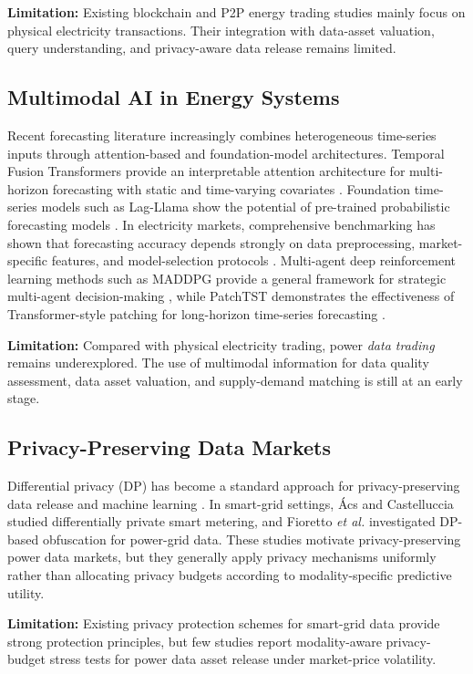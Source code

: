 \documentclass{ieeeaccess}
\begin{document}
\textbf{Limitation:} Existing blockchain and P2P energy trading studies mainly focus on physical electricity transactions. Their integration with data-asset valuation, query understanding, and privacy-aware data release remains limited.

\subsection{Multimodal AI in Energy Systems}
Recent forecasting literature increasingly combines heterogeneous time-series inputs through attention-based and foundation-model architectures. Temporal Fusion Transformers provide an interpretable attention architecture for multi-horizon forecasting with static and time-varying covariates \cite{b14}. Foundation time-series models such as Lag-Llama show the potential of pre-trained probabilistic forecasting models \cite{b15}. In electricity markets, comprehensive benchmarking has shown that forecasting accuracy depends strongly on data preprocessing, market-specific features, and model-selection protocols \cite{b16}. Multi-agent deep reinforcement learning methods such as MADDPG provide a general framework for strategic multi-agent decision-making \cite{b17}, while PatchTST demonstrates the effectiveness of Transformer-style patching for long-horizon time-series forecasting \cite{b18}.

\textbf{Limitation:} Compared with physical electricity trading, power \textit{data trading} remains underexplored. The use of multimodal information for data quality assessment, data asset valuation, and supply-demand matching is still at an early stage.

\subsection{Privacy-Preserving Data Markets}
Differential privacy (DP) has become a standard approach for privacy-preserving data release and machine learning \cite{b21,b22}. In smart-grid settings, \'{A}cs and Castelluccia \cite{b19} studied differentially private smart metering, and Fioretto \textit{et al.} \cite{b20} investigated DP-based obfuscation for power-grid data. These studies motivate privacy-preserving power data markets, but they generally apply privacy mechanisms uniformly rather than allocating privacy budgets according to modality-specific predictive utility.

\textbf{Limitation:} Existing privacy protection schemes for smart-grid data provide strong protection principles, but few studies report modality-aware privacy-budget stress tests for power data asset release under market-price volatility.
\end{document}
